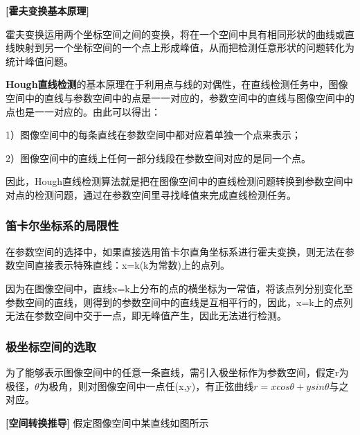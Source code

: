 \documentclass{article}
\begin{document}
\textbf{[霍夫变换基本原理]}

霍夫变换运用两个坐标空间之间的变换，将在一个空间中具有相同形状的曲线或直线映射到另一个坐标空间的一个点上形成峰值，从而把检测任意形状的问题转化为统计峰值问题。

\textbf{Hough直线检测}的基本原理在于利用点与线的对偶性，在直线检测任务中，图像空间中的直线与参数空间中的点是一一对应的，参数空间中的直线与图像空间中的点也是一一对应的。由此可以得出：

1）图像空间中的每条直线在参数空间中都对应着单独一个点来表示；

2）图像空间中的直线上任何一部分线段在参数空间对应的是同一个点。

因此，Hough直线检测算法就是把在图像空间中的直线检测问题转换到参数空间中对点的检测问题，通过在参数空间里寻找峰值来完成直线检测任务。

\subsubsection{笛卡尔坐标系的局限性}
在参数空间的选择中，如果直接选用笛卡尔直角坐标系进行霍夫变换，则无法在参数空间直接表示特殊直线：x=k(k为常数)上的点列。

因为在图像空间中，直线x=k上分布的点的横坐标为一常值，将该点列分别变化至参数空间的直线，则得到的参数空间中的直线是互相平行的，因此，x=k上的点列无法在参数空间中交于一点，即无峰值产生，因此无法进行检测。

\subsubsection{极坐标空间的选取}
为了能够表示图像空间中的任意一条直线，需引入极坐标作为参数空间，假定r为极径，$\theta$为极角，则对图像空间中一点任(x,y)，有正弦曲线$r=xcos\theta+ysin\theta$与之对应。

\textbf{[空间转换推导]}
假定图像空间中某直线如图所示

\begin{center}
\end{center}
\end{document}

